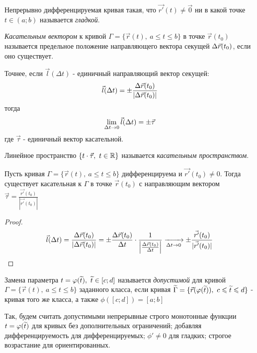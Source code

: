 \begin{definition}
	Непрерывно дифференцируемая кривая такая, что $\vec{r'}(t) \neq \vec{0}$ ни в какой точке $t \in (a; b)$ называется \textit{гладкой}.
\end{definition}

\begin{definition}
	\textit{Касательным вектором} к кривой $\Gamma = \{\vec{r}(t),\ a \le t \le b\}$ в точке $\vec{r}(t_0)$ называется предельное положение направляющего вектора секущей $\Delta\vec{r}(t_0)$, если оно существует.
	
	Точнее, если $\vec{l}(\Delta t)$ - единичный направляющий вектор секущей:
	\[
		\vec{l}(\Delta t) = \pm \frac{\Delta\vec{r}(t_0)}{|\Delta\vec{r}(t_0)|}
	\]
	тогда
	\[
		\lim\limits_{\Delta t \to 0} \vec{l}(\Delta t) = \pm \vec{\tau}
	\]
	где $\vec{\tau}$ - единичный вектор касательной.
\end{definition}

\begin{definition}
	Линейное пространство $\{t \cdot \vec{\tau},\ t \in \mathbb{R}\}$ называется \textit{касательным пространством}.
\end{definition}


\begin{lemma}
	Пусть кривая $\Gamma = \{\vec{r}(t),\ a \le t \le b\}$ дифференцируема и $\vec{r'}(t_0) \neq 0$. Тогда существует касательная к $\Gamma$ в точке $\vec{r}(t_0)$ с направляющим вектором $\vec{\tau} = \frac{\vec{r'}(t_0)}{|\vec{r'}(t_0)|}$
\end{lemma}

\begin{proof}
	\[
		\vec{l}(\Delta t) = \frac{\Delta\vec{r}(t_0)}{|\Delta\vec{r}(t_0)|} = \pm \frac{\Delta\vec{r}(t_0)}{\Delta t} \cdot \frac{1}{\left|\frac{\Delta\vec{r}(t_0)}{\Delta t}\right|} \xrightarrow[\Delta t \to 0]{} \pm \frac{\vec{r'}(t_0)}{|\vec{r'}(t_0)|}
	\]
\end{proof}

\begin{definition}
	Замена параметра $t = \varphi(\widetilde{t}),\ \widetilde{t} \in [c; d]$ называется \textit{допустимой} для кривой $\Gamma = \{\vec{r}(t),\ a \le t \le b\}$ заданного класса, если кривая $\widetilde{\Gamma} = \{\vec{r}(\varphi(\widetilde{t})),\ c \leqslant \widetilde{t} \leqslant d\}$ - кривая того же класса, а также $\phi([c; d]) = [a; b]$
	
	Так, будем считать допустимыми непрерывные строго монотонные функции $t = \varphi(\widetilde{t})$ для кривых без дополнительных ограничений; добавляя дифференцируемость для дифференцируемых; $\phi' \neq 0$ для гладких; строгое возрастание для ориентированных.
\end{definition}


